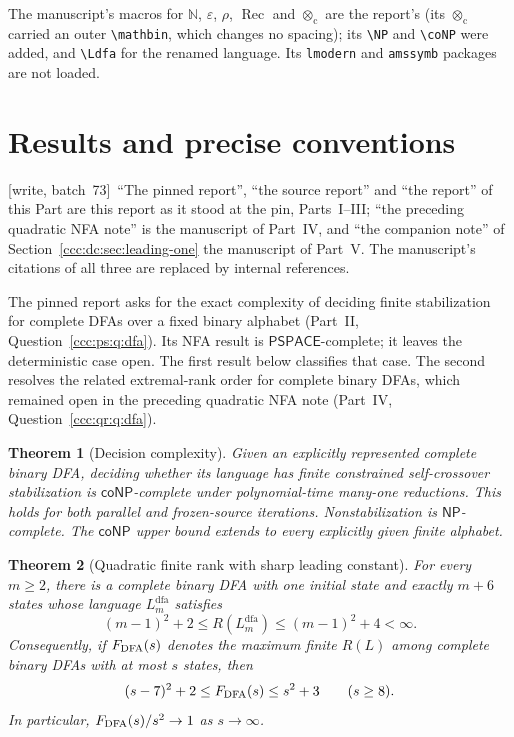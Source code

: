 \documentclass[11pt,letterpaper]{article}
\newtheorem{theorem}{Theorem}[section]
\theoremstyle{definition}
\theoremstyle{remark}
\newcommand{\N}{\mathbb N}
\newcommand{\eps}{\varepsilon}
\newcommand{\rec}{\operatorname{Rec}}
\newcommand{\cut}{\otimes_{\mathrm c}}
\newcommand{\rank}{\rho}
\newcommand{\wsevthree}{\textup{[write, batch~73]}}
\newcommand{\NP}{\mathsf{NP}}
\newcommand{\coNP}{\mathsf{coNP}}
\newcommand{\Ldfa}[1]{L^{\mathrm{dfa}}_{#1}}
\begin{document}
The manuscript's macros for $\N$, $\eps$, $\rank$, $\rec$ and $\cut$ are the
report's (its $\cut$ carried an outer \verb|\mathbin|, which changes no
spacing); its \verb|\NP| and \verb|\coNP| were added, and \verb|\Ldfa| for the
renamed language. Its \texttt{lmodern} and \texttt{amssymb} packages are not
loaded.

\section{Results and precise conventions}\label{ccc:dc:sec:intro}

\wsevthree\ ``The pinned report'', ``the source report'' and ``the report''
of this Part are this report as it stood at the pin, Parts~I--III; ``the
preceding quadratic NFA note'' is the manuscript of Part~IV, and ``the
companion note'' of Section~\ref{ccc:dc:sec:leading-one} the manuscript of
Part~V. The manuscript's citations of all three are replaced by internal
references.

The pinned report asks for the exact complexity of deciding finite stabilization for complete DFAs over a fixed binary alphabet (Part~II, Question~\ref{ccc:ps:q:dfa}). Its NFA result is $\mathsf{PSPACE}$-complete; it leaves the deterministic case open. The first result below classifies that case. The second resolves the related extremal-rank order for complete binary DFAs, which remained open in the preceding quadratic NFA note (Part~IV, Question~\ref{ccc:qr:q:dfa}).

\begin{theorem}[Decision complexity]\label{ccc:dc:thm:complexity}
Given an explicitly represented complete binary DFA, deciding whether its language has finite constrained self-crossover stabilization is $\coNP$-complete under polynomial-time many-one reductions. This holds for both parallel and frozen-source iterations. Nonstabilization is $\NP$-complete. The $\coNP$ upper bound extends to every explicitly given finite alphabet.
\end{theorem}

\begin{theorem}[Quadratic finite rank with sharp leading constant]\label{ccc:dc:thm:rank}
For every $m\ge2$, there is a complete binary DFA with one initial state and exactly $m+6$ states whose language $\Ldfa m$ satisfies
\[
(m-1)^2+2\le R(\Ldfa m)\le(m-1)^2+4<\infty.
\]
Consequently, if $F_{\rm DFA}(s)$ denotes the maximum finite $R(L)$ among complete binary DFAs with at most $s$ states, then
\[
(s-7)^2+2\le F_{\rm DFA}(s)\le s^2+3\qquad(s\ge8).
\]
In particular, $F_{\rm DFA}(s)/s^2\to1$ as $s\to\infty$.
\end{theorem}
\end{document}
